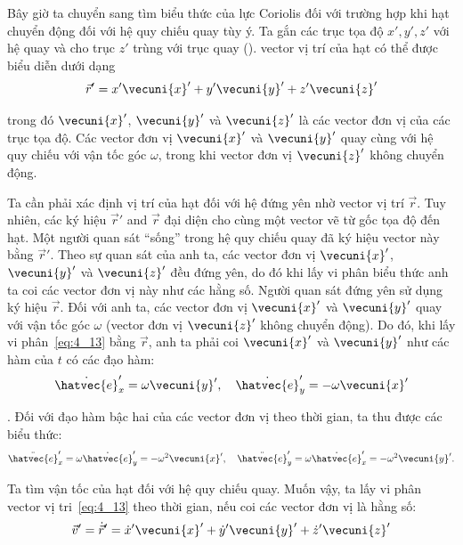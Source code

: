 Bây giờ ta chuyển sang tìm biểu thức của lực Coriolis đối với trường hợp khi hạt chuyển động đối với hệ quy chiếu quay tùy ý. Ta gắn các trục tọa độ $x', y', z'$ với hệ quay và cho trục $z'$ trùng với trục quay (). vector vị trí của hạt có thể được biểu diễn dưới dạng
\begin{equation}\label{eq:4_13}
\vec{r}' = x'\vecuni{x}' + y'\vecuni{y}' + z'\vecuni{z}'
\end{equation}

\noindent
trong đó $\vecuni{x}'$, $\vecuni{y}'$ và $\vecuni{z}'$ là các vector đơn vị của các trục tọa độ. Các vector đơn vị $\vecuni{x}'$ và $\vecuni{y}'$ quay cùng với hệ quy chiếu với vận tốc góc $\omega$, trong khi vector đơn vị $\vecuni{z}'$ không chuyển động.

Ta cần phải xác định vị trí của hạt đối với hệ đứng yên nhờ vector vị trí $\vec{r}$. Tuy nhiên, các ký hiệu $\vec{r}'$ and $\vec{r}$ đại diện cho cùng một vector vẽ từ gốc tọa độ đến hạt. Một người quan sát ``sống'' trong hệ quy chiếu quay đã ký hiệu vector này bằng $\vec{r}'$. Theo sự quan sát của anh ta, các vector đơn vị $\vecuni{x}'$, $\vecuni{y}'$ và $\vecuni{z}'$ đều đứng yên, do đó khi lấy vi phân biểu thức  anh ta coi các vector đơn vị này như các hằng số. Người quan sát đứng yên sử dụng ký hiệu $\vec{r}$. Đối với anh ta, các vector đơn vị $\vecuni{x}'$ và $\vecuni{y}'$ quay với vận tốc góc $\omega$ (vector đơn vị $\vecuni{z}'$ không chuyển động). Do đó, khi lấy vi phân~\eqref{eq:4_13} bằng $\vec{r}$, anh ta phải coi $\vecuni{x}'$ và $\vecuni{y}'$ như các hàm của $t$ có các đạo hàm:
\begin{equation}\label{eq:4_14}
\dot{\hatvec{e}}_x' = \omega\vecuni{y}',\quad \dot{\hatvec{e}}_y' = -\omega\vecuni{x}'
\end{equation}

. Đối với đạo hàm bậc hai của các vector đơn vị theo thời gian, ta thu được các biểu thức:
\begin{equation}\label{eq:4_15}
\ddot{\hatvec{e}}_x' = \omega\dot{\hatvec{e}}_y' = -\omega^2\vecuni{x}',\quad \ddot{\hatvec{e}}_y' = \omega\dot{\hatvec{e}}_x' = -\omega^2\vecuni{y}'.
\end{equation}

Ta tìm vận tốc của hạt đối với hệ quy chiếu quay. Muốn vậy, ta lấy vi phân vector vị tri~\eqref{eq:4_13} theo thời gian, nếu coi các vector đơn vị là hằng số:
\begin{equation}\label{eq:4_16}
\vec{v}' = \dot{\vec{r}}' = \dot{x}'\vecuni{x}' + \dot{y}'\vecuni{y}' + \dot{z}'\vecuni{z}'
\end{equation}

